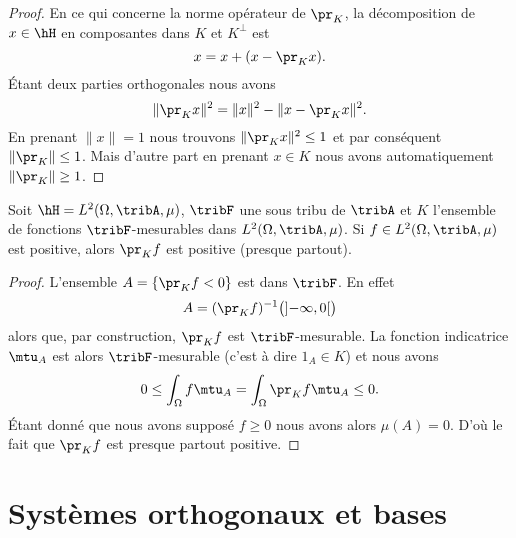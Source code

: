 \begin{proof}
    En ce qui concerne la norme opérateur de \( \pr_K\), la décomposition de \( x\in\hH\) en composantes dans \( K\) et \( K^{\perp}\) est
    \begin{equation}
        x=x+(x-\pr_Kx).
    \end{equation}
    Étant deux parties orthogonales nous avons
    \begin{equation}
        \| \pr_Kx \|^2=\| x \|^2-\| x-\pr_Kx \|^2.
    \end{equation}
    En prenant \( \| x \|=1\) nous trouvons \( \| \pr_Kx \|^2\leq 1\) et par conséquent \( \| \pr_K \|\leq 1\). Mais d'autre part en prenant \( x\in K\) nous avons automatiquement \( \| \pr_K \|\geq 1\).
\end{proof}

\begin{proposition}
    Soit \( \hH=L^2(\Omega,\tribA,\mu)\), \( \tribF\) une sous tribu de \( \tribA\) et \( K\) l'ensemble de fonctions \( \tribF\)-mesurables dans \( L^2(\Omega,\tribA,\mu)\). Si \( f\in L^2(\Omega,\tribA,\mu)\) est positive, alors \( \pr_Kf\) est positive (presque partout).
\end{proposition}

\begin{proof}
    L'ensemble \( A=\{ \pr_Kf<0 \}\) est dans \( \tribF\). En effet 
    \begin{equation}
        A=(\pr_Kf)^{-1}\big( \mathopen] -\infty , 0 \mathclose[\big)
    \end{equation}
    alors que, par construction, \( \pr_Kf\) est \( \tribF\)-mesurable. La fonction indicatrice \( \mtu_A\) est alors \( \tribF\)-mesurable (c'est à dire \( 1_A\in K\)) et nous avons
    \begin{equation}
        0\leq\int_{\Omega}f\mtu_A=\int_{\Omega}\pr_Kf\mtu_A\leq 0.
    \end{equation}
    Étant donné que nous avons supposé \( f\geq 0\) nous avons alors \( \mu(A)=0\). D'où le fait que \( \pr_Kf\) est presque partout positive.
\end{proof}


\section{Systèmes orthogonaux et bases}

